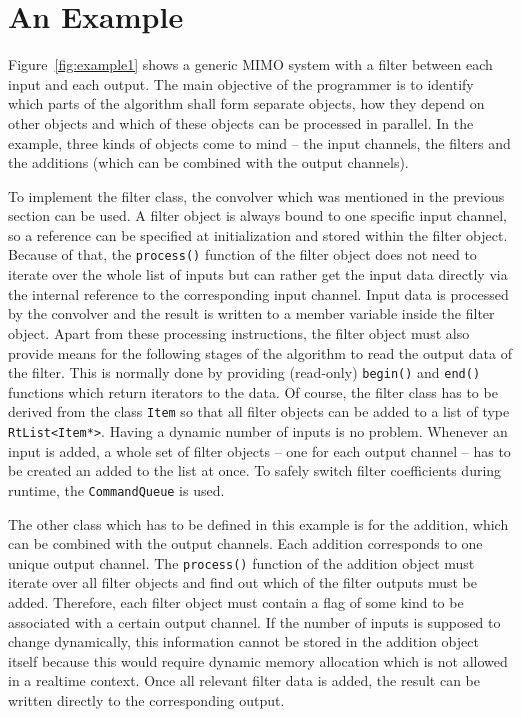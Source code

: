 \documentclass[11pt,letterpaper]{article}
\newcommand{\code}{\texttt}
\begin{document}
\section{An Example}

Figure~\ref{fig:example1} shows a generic MIMO system with a filter between each
input and each output.
The main objective of the programmer is to identify which parts of the algorithm
shall form separate objects, how they depend on other objects and which of these
objects can be processed in parallel.
In the example, three kinds of objects come to mind -- the input channels, the filters and the additions (which
can be combined with the output channels).

To implement the filter class, the convolver which was mentioned in
the previous section can be used.
A filter object is always bound to one specific input channel, so a reference
can be specified at initialization and stored within the filter object.
Because of that, the \code{process()} function of the filter object does not
need to iterate over the whole list of inputs but can rather get the input data
directly via the internal reference to the corresponding input channel.
Input data is processed by the convolver and the result is written to a
member variable inside the filter object.
Apart from these processing instructions, the filter object must also provide
means for the following stages of the algorithm to read the output data of the
filter.
This is normally done by providing (read-only) \code{begin()} and \code{end()} functions
which return iterators to the data.
Of course, the filter class has to be derived from the class \code{Item} so that
all filter objects can be added to a list of type \code{RtList<Item*>}.
Having a dynamic number of inputs is no problem. Whenever an input is added, a
whole set of filter objects -- one for each output channel -- has to be created
an added to the list at once.
To safely switch filter coefficients during runtime,
the \code{CommandQueue} is used.

The other class which has to be defined in this example is for the addition,
which can be combined with the output channels. Each addition
corresponds to one unique output channel.
The \code{process()} function of the addition object must iterate over all
filter objects and find out which of the filter outputs must be added.
Therefore, each filter object must contain a flag of some kind to be associated
with a certain output channel.
If the number of inputs is supposed to change dynamically, this information
cannot be stored in the addition object itself because this would require
dynamic memory allocation which is not allowed in a realtime context.
Once all relevant filter data is added, the result can be written directly to
the corresponding output.
\end{document}
